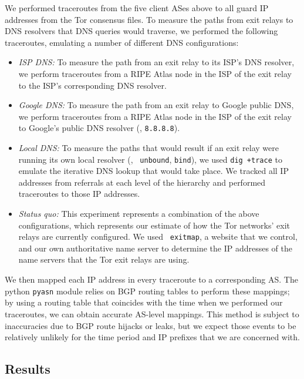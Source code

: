 We performed traceroutes from the five client ASes above to all guard IP
      addresses from the Tor consensus files. To measure the paths from
      exit relays to DNS resolvers that DNS queries would traverse, we
      performed the following traceroutes, emulating a number of
      different DNS configurations:
\begin{itemize}
    \item \emph{ISP DNS:} To measure the path from an exit relay to its
      ISP's DNS resolver, we perform traceroutes from a RIPE Atlas node
      in the ISP of the exit relay to the ISP's corresponding DNS resolver.

    \item \emph{Google DNS:} To measure the path from an exit relay to
      Google public DNS, we perform traceroutes from a RIPE Atlas node
      in the ISP of the exit relay to Google's public DNS resolver (\ie,
      {\tt 8.8.8.8}).

    \item \emph{Local DNS:} To measure the paths that would result if an
      exit relay were running its own local resolver (\eg, {\tt
        unbound}, {\tt bind}), we used {\tt dig +trace} to emulate the
      iterative DNS lookup that would take place. We tracked all IP
      addresses from referrals at each level of the hierarchy and
      performed traceroutes to those IP addresses.

    \item \emph{Status quo:} This experiment represents a combination of
      the above configurations, which represents our estimate of how the
      Tor networks' exit relays are currently configured. We used {\tt
        exitmap}, a website that we control, and our own authoritative
      name server to determine the IP addresses of the name servers that
      the Tor exit relays are using.
\end{itemize}
\noindent
We then mapped each IP address in every traceroute to a corresponding
AS.  The python {\tt pyasn} module relies on BGP routing tables to
perform these mappings; by using a routing table that coincides with the
time when we performed our traceroutes, we can obtain accurate AS-level
mappings.  This method is subject to inaccuracies due to BGP route
hijacks or leaks, but we expect those events to be relatively unlikely
for the time period and IP prefixes that we are concerned with.

\subsection{Results}

